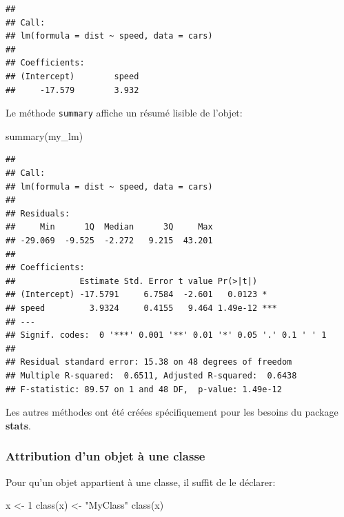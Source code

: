 \documentclass[
  11pt,
  french,
  a4paper,
  extrafontsizes,onecolumn,openright
  ]{memoir}
\newenvironment{Shaded}{\begin{snugshade}}{\end{snugshade}}
\newcommand{\DecValTok}[1]{\textcolor[rgb]{0.00,0.00,0.81}{#1}}
\newcommand{\FunctionTok}[1]{\textcolor[rgb]{0.00,0.00,0.00}{#1}}
\newcommand{\NormalTok}[1]{#1}
\newcommand{\OtherTok}[1]{\textcolor[rgb]{0.56,0.35,0.01}{#1}}
\newcommand{\StringTok}[1]{\textcolor[rgb]{0.31,0.60,0.02}{#1}}
\begin{document}
\begin{verbatim}
## 
## Call:
## lm(formula = dist ~ speed, data = cars)
## 
## Coefficients:
## (Intercept)        speed  
##     -17.579        3.932
\end{verbatim}

\normalsize
Le méthode \texttt{summary} affiche un résumé lisible de l'objet:

\scriptsize

\begin{Shaded}
\begin{Highlighting}[]
\FunctionTok{summary}\NormalTok{(my\_lm)}
\end{Highlighting}
\end{Shaded}

\begin{verbatim}
## 
## Call:
## lm(formula = dist ~ speed, data = cars)
## 
## Residuals:
##     Min      1Q  Median      3Q     Max 
## -29.069  -9.525  -2.272   9.215  43.201 
## 
## Coefficients:
##             Estimate Std. Error t value Pr(>|t|)    
## (Intercept) -17.5791     6.7584  -2.601   0.0123 *  
## speed         3.9324     0.4155   9.464 1.49e-12 ***
## ---
## Signif. codes:  0 '***' 0.001 '**' 0.01 '*' 0.05 '.' 0.1 ' ' 1
## 
## Residual standard error: 15.38 on 48 degrees of freedom
## Multiple R-squared:  0.6511, Adjusted R-squared:  0.6438 
## F-statistic: 89.57 on 1 and 48 DF,  p-value: 1.49e-12
\end{verbatim}

\normalsize

Les autres méthodes ont été créées spécifiquement pour les besoins du package \textbf{stats}.

\hypertarget{attribution-dun-objet-uxe0-une-classe}{%
\subsubsection{Attribution d'un objet à une classe}\label{attribution-dun-objet-uxe0-une-classe}}

Pour qu'un objet appartient à une classe, il suffit de le déclarer:

\scriptsize

\begin{Shaded}
\begin{Highlighting}[]
\NormalTok{x }\OtherTok{\textless{}{-}} \DecValTok{1}
\FunctionTok{class}\NormalTok{(x) }\OtherTok{\textless{}{-}} \StringTok{"MyClass"}
\FunctionTok{class}\NormalTok{(x)}
\end{Highlighting}
\end{Shaded}
\end{document}

